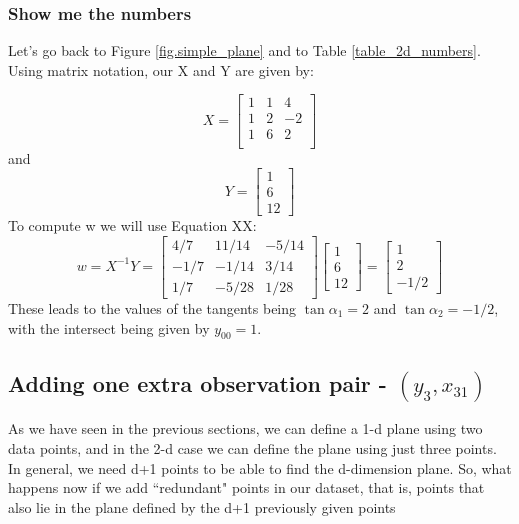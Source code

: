 \subsubsection{Show me the numbers}
\label{section_example_plane}
Let's go back to Figure \ref{fig.simple_plane} and to Table \ref{table_2d_numbers}. Using matrix notation, our X and Y are given by:

\begin{equation}
X =
\begin{bmatrix}
1 & 1 & 4\\
1 & 2 &-2\\
1 &6 & 2\\
\end{bmatrix}
\label{x_matrix_2d}
\end{equation}
and
\begin{equation}
Y = \begin{bmatrix}
1\\
6\\
12
\end{bmatrix}
\label{y_matrix_2d}
\end{equation}
To compute w we will use Equation XX:
\begin{equation}
w = X^{-1} Y =
\begin{bmatrix}
4/7 & 11/14 & -5/14\\
-1/7 & -1/14 &  3/14\\
1/7 & -5/28 &  1/28
\end{bmatrix}
\begin{bmatrix}
1\\
6\\
12
\end{bmatrix}
=
\begin{bmatrix}
1\\
2\\
-1/2
\end{bmatrix}
\label{equation_for_w_2d_example}
\end{equation}
These leads to the values of the tangents being $\tan\alpha_1 = 2$ and $\tan\alpha_2 = -1/2$, with the intersect being given by $y_{00}=1$.

\subsection{Adding one extra observation pair - $(y_3, x_{31})$}
As we have seen in the previous sections, we can define a 1-d plane using two data points, and in the 2-d case we can define the plane using just three points. In general, we need d+1 points to be able to find the d-dimension plane. So, what happens now if we add ``redundant" points in our dataset, that is, points that also lie in the plane defined by the d+1 previously given points  

